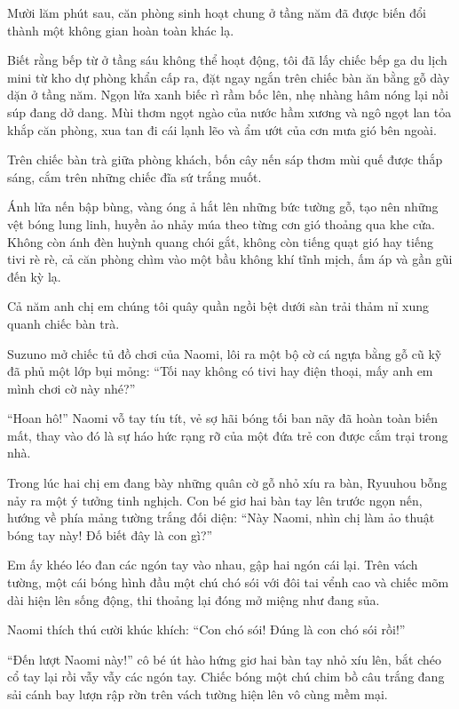 \documentclass[../main.tex]{subfiles}
\begin{document}
Mười lăm phút sau, căn phòng sinh hoạt chung ở tầng năm đã được biến đổi thành một không gian hoàn toàn khác lạ.

Biết rằng bếp từ ở tầng sáu không thể hoạt động, tôi đã lấy chiếc bếp ga du lịch mini từ kho dự phòng khẩn cấp ra, đặt ngay ngắn trên chiếc bàn ăn bằng gỗ dày dặn ở tầng năm. Ngọn lửa xanh biếc rì rầm bốc lên, nhẹ nhàng hâm nóng lại nồi súp đang dở dang. Mùi thơm ngọt ngào của nước hầm xương và ngô ngọt lan tỏa khắp căn phòng, xua tan đi cái lạnh lẽo và ẩm ướt của cơn mưa gió bên ngoài.

Trên chiếc bàn trà giữa phòng khách, bốn cây nến sáp thơm mùi quế được thắp sáng, cắm trên những chiếc đĩa sứ trắng muốt.

Ánh lửa nến bập bùng, vàng óng ả hắt lên những bức tường gỗ, tạo nên những vệt bóng lung linh, huyền ảo nhảy múa theo từng cơn gió thoảng qua khe cửa. Không còn ánh đèn huỳnh quang chói gắt, không còn tiếng quạt gió hay tiếng tivi rè rè, cả căn phòng chìm vào một bầu không khí tĩnh mịch, ấm áp và gần gũi đến kỳ lạ.

Cả năm anh chị em chúng tôi quây quần ngồi bệt dưới sàn trải thảm nỉ xung quanh chiếc bàn trà.

Suzuno mở chiếc tủ đồ chơi của Naomi, lôi ra một bộ cờ cá ngựa bằng gỗ cũ kỹ đã phủ một lớp bụi mỏng: ``Tối nay không có tivi hay điện thoại, mấy anh em mình chơi cờ này nhé?''

``Hoan hô!'' Naomi vỗ tay tíu tít, vẻ sợ hãi bóng tối ban nãy đã hoàn toàn biến mất, thay vào đó là sự háo hức rạng rỡ của một đứa trẻ con được cắm trại trong nhà.

Trong lúc hai chị em đang bày những quân cờ gỗ nhỏ xíu ra bàn, Ryuuhou bỗng nảy ra một ý tưởng tinh nghịch. Con bé giơ hai bàn tay lên trước ngọn nến, hướng về phía mảng tường trắng đối diện: ``Này Naomi, nhìn chị làm ảo thuật bóng tay này! Đố biết đây là con gì?''

Em ấy khéo léo đan các ngón tay vào nhau, gập hai ngón cái lại. Trên vách tường, một cái bóng hình đầu một chú chó sói với đôi tai vểnh cao và chiếc mõm dài hiện lên sống động, thi thoảng lại đóng mở miệng như đang sủa.

Naomi thích thú cười khúc khích: ``Con chó sói! Đúng là con chó sói rồi!''

``Đến lượt Naomi này!'' cô bé út hào hứng giơ hai bàn tay nhỏ xíu lên, bắt chéo cổ tay lại rồi vẫy vẫy các ngón tay. Chiếc bóng một chú chim bồ câu trắng đang sải cánh bay lượn rập rờn trên vách tường hiện lên vô cùng mềm mại.
\end{document}
